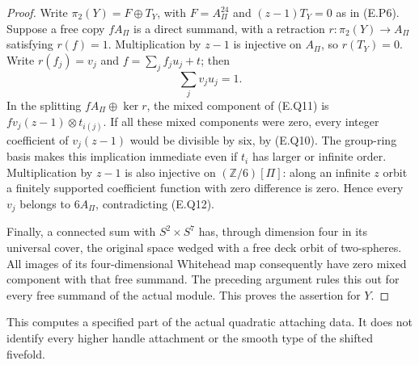 \begin{proof}
Write $\pi_2(Y)=F\oplus T_Y$, with $F=A_\Pi^{24}$ and
$(z-1)T_Y=0$ as in (E.P6).  Suppose a free copy $fA_\Pi$
is a direct summand, with a retraction $r:\pi_2(Y)\to A_\Pi$
satisfying $r(f)=1$.  Multiplication by $z-1$ is injective
on $A_\Pi$, so $r(T_Y)=0$.  Write $r(f_j)=v_j$ and
$f=\sum_j f_j u_j+t$; then
\[
                         \sum_j v_j u_j=1.
 \tag{E.Q12}
\]
In the splitting $fA_\Pi\oplus\ker r$, the mixed component
of (E.Q11) is $f v_j(z-1)\otimes t_{i(j)}$.  If all these
mixed components were zero, every integer coefficient of
$v_j(z-1)$ would be divisible by six, by (E.Q10).  The
group-ring basis makes this implication immediate even if
$t_i$ has larger or infinite order.  Multiplication by
$z-1$ is also injective on $(\mathbb Z/6)[\Pi]$: along an
infinite $z$ orbit a finitely supported coefficient function
with zero difference is zero.  Hence every $v_j$ belongs
to $6A_\Pi$, contradicting (E.Q12).

Finally, a connected sum with $S^2\times S^7$ has, through
dimension four in its universal cover, the original space
wedged with a free deck orbit of two-spheres.  All images
of its four-dimensional Whitehead map consequently have
zero mixed component with that free summand.  The preceding
argument rules this out for every free summand of the actual
module.  This proves the assertion for $Y$.
\end{proof}

This computes a specified part of the actual quadratic
attaching data.  It does not identify every higher handle
attachment or the smooth type of the shifted fivefold.

